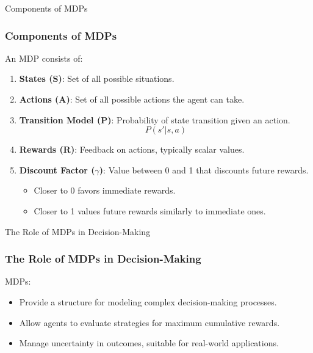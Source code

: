 \documentclass[aspectratio=169]{beamer}
\begin{document}
\begin{frame}[fragile]{Components of MDPs}
    \frametitle{Components of MDPs}
    An MDP consists of:
    \begin{enumerate}
        \item \textbf{States (S)}: Set of all possible situations.
        \item \textbf{Actions (A)}: Set of all possible actions the agent can take.
        \item \textbf{Transition Model (P)}: Probability of state transition given an action.
            \begin{equation}
                P(s' | s, a)
            \end{equation}
        \item \textbf{Rewards (R)}: Feedback on actions, typically scalar values.
        \item \textbf{Discount Factor ($\gamma$)}: Value between 0 and 1 that discounts future rewards.
        \begin{itemize}
            \item Closer to 0 favors immediate rewards.
            \item Closer to 1 values future rewards similarly to immediate ones.
        \end{itemize}
    \end{enumerate}
\end{frame}

\begin{frame}[fragile]{The Role of MDPs in Decision-Making}
    \frametitle{The Role of MDPs in Decision-Making}
    MDPs:
    \begin{itemize}
        \item Provide a structure for modeling complex decision-making processes.
        \item Allow agents to evaluate strategies for maximum cumulative rewards.
        \item Manage uncertainty in outcomes, suitable for real-world applications.
    \end{itemize}
\end{frame}
\end{document}
